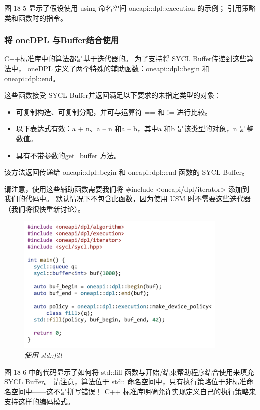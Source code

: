 图 18-5 显示了假设使用 using 命名空间 oneapi::dpl::execution 的示例； 引用策略类和函数时的指令。

\subsubsection{将 oneDPL 与Buffer结合使用}
C++标准库中的算法都是基于迭代器的。 为了支持将 SYCL Buffer传递到这些算法中，
oneDPL 定义了两个特殊的辅助函数：oneapi::dpl::begin 和 oneapi::dpl::end。

这些函数接受 SYCL Buffer并返回满足以下要求的未指定类型的对象：

\begin{itemize}
	\item 可复制构造、可复制分配，并可与运算符 == 和 != 进行比较。

	\item 以下表达式有效：a + n、a – n 和a – b，其中a 和b 是该类型的对象，n 是整数值。

	\item 具有不带参数的get\_buffer 方法。
\end{itemize}

该方法返回传递给 oneapi::dpl::begin 和 oneapi::dpl::end 函数的 SYCL Buffer。

请注意，使用这些辅助函数需要我们将 \#include <oneapi/dpl/iterator> 添加到我们的代码中。 
默认情况下不包含此函数，因为使用 USM 时不需要这些迭代器（我们将很快重新讨论）。

\begin{figure}[H]
	\centering
	\includegraphics[width=0.9\textwidth]{figs/F18.6.png}
	\caption{\textit{使用 std::fill }}
\end{figure}

图 18-6 中的代码显示了如何将 std::fill 函数与开始/结束帮助程序结合使用来填充 SYCL Buffer。 
请注意，算法位于 std:: 命名空间中，只有执行策略位于非标准命名空间中——这不是拼写错误！ 
C++ 标准库明确允许实现定义自己的执行策略来支持这样的编码模式。

